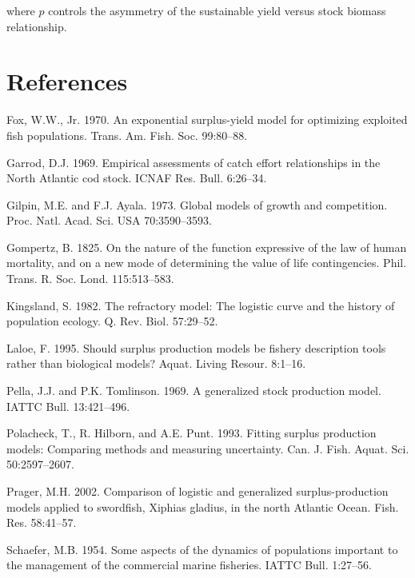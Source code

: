\documentclass[fleqn]{article}
\begin{document}
where $p$ controls the asymmetry of the sustainable yield versus stock biomass
relationship.

\newpage

\section{References}

\small\sloppy\frenchspacing\setlength{\hyphenpenalty}{1000}
\begin{description}
  \item Fox, W.W., Jr. 1970. An exponential surplus-yield model for optimizing
  exploited fish populations. Trans. Am. Fish. Soc. 99:80--88.

  \item Garrod, D.J. 1969. Empirical assessments of catch effort relationships
  in the North Atlantic cod stock. ICNAF Res. Bull. 6:26--34.

  \item Gilpin, M.E. and F.J. Ayala. 1973. Global models of growth and
  competition. Proc. Natl. Acad. Sci. USA 70:3590--3593.

  \item Gompertz, B. 1825. On the nature of the function expressive of the law
  of human mortality, and on a new mode of determining the value of life
  contingencies. Phil. Trans. R. Soc. Lond. 115:513--583.

  \item Kingsland, S. 1982. The refractory model: The logistic curve and the
  history of population ecology. Q. Rev. Biol. 57:29--52.

  \item Laloe, F. 1995. Should surplus production models be fishery description
  tools rather than biological models? Aquat. Living Resour. 8:1--16.

  \item Pella, J.J. and P.K. Tomlinson. 1969. A generalized stock production
  model. IATTC Bull. 13:421--496.

  \item Polacheck, T., R. Hilborn, and A.E. Punt. 1993. Fitting surplus
  production models: Comparing methods and measuring uncertainty. Can. J. Fish.
  Aquat. Sci. 50:2597--2607.

  \item Prager, M.H. 2002. Comparison of logistic and generalized
  surplus-production models applied to swordfish, Xiphias gladius, in the north
  Atlantic Ocean. Fish. Res. 58:41--57.

  \item Schaefer, M.B. 1954. Some aspects of the dynamics of populations
  important to the management of the commercial marine fisheries. IATTC Bull.
  1:27--56.
\end{description}
\end{document}
